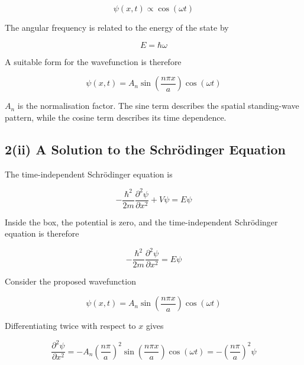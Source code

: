 \documentclass{article}
\begin{document}
\begin{equation*}
\psi(x,t)\propto\cos(\omega t)
\end{equation*}

The angular frequency is related to the energy of the state by

\begin{equation*}
E=\hbar\omega
\end{equation*}

\vspace{1\baselineskip}

A suitable form for the wavefunction is therefore

\begin{equation*}
\boxed{\psi(x,t) = A_n\sin\left(\frac{n\pi x}{a}\right)\cos(\omega t)}
\end{equation*}

$A_n$ is the normalisation factor. The sine term describes the
spatial standing-wave pattern, while the cosine term
describes its time dependence.


\subsection*{2(ii) A Solution to the Schrödinger Equation}

The time-independent Schrödinger equation is

\begin{equation*}
-\frac{\hbar^2}{2m} \frac{\partial^2\psi}{\partial x^2} + V\psi = E\psi
\end{equation*}

Inside the box, the potential is zero, and the time-independent Schrödinger equation is therefore

\begin{equation*}
-\frac{\hbar^2}{2m} \frac{\partial^2\psi}{\partial x^2} = E\psi
\end{equation*}

Consider the proposed wavefunction

\begin{equation*}
\psi(x,t) = A_n\sin\left(\frac{n\pi x}{a}\right)\cos(\omega t)
\end{equation*}

Differentiating twice with respect to $x$ gives

\begin{equation*}
\frac{\partial^2\psi}{\partial x^2} = -A_n \left(\frac{n\pi}{a}\right)^2 \sin\left(\frac{n\pi x}{a}\right) \cos(\omega t)
= -\left(\frac{n\pi}{a}\right)^2\psi
\end{equation*}
\end{document}
